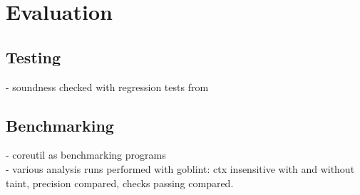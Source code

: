 
\chapter{Evaluation}\label{chapter:evaluation}
  
  \section{Testing}
    - soundness checked with regression tests from \gob
  
  \section{Benchmarking}
    - coreutil as benchmarking programs\\
    - various analysis runs performed with goblint: ctx insensitive with and without taint, precision compared, checks passing compared. 
